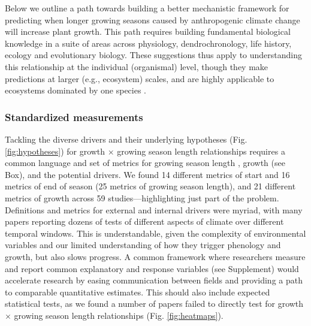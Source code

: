 \documentclass[11pt]{article}
\begin{document}

Below we outline a path towards building a better mechanistic framework for predicting when longer growing seasons caused by anthropogenic climate change will increase plant growth. This path requires building fundamental biological knowledge in a suite of areas across physiology, dendrochronology, life history, ecology and evolutionary biology. These suggestions thus apply to understanding this relationship at the individual (organismal) level, though they make predictions at larger (e.g., ecosystem) scales, and are highly applicable to ecosystems dominated by one species \citep[e.g.,][]{chen1999effects}. %

\subsubsection*{Standardized measurements} %

Tackling the diverse drivers and their underlying hypotheses (Fig. \ref{fig:hypotheses}) for growth $\times$ growing season length relationships requires a common language and set of metrics for growing season length \citep{korner2023four}, growth (see Box), and the potential drivers. We found 14 different metrics of start and 16 metrics of end of season (25 metrics of growing season length), and 21 different metrics of growth across 59 studies---highlighting just part of the problem. Definitions and metrics for external and internal drivers were myriad, with many papers reporting dozens of tests of different aspects of climate over different temporal windows. This is understandable, given the complexity of environmental variables and our limited understanding of how they trigger phenology and growth, but also slows progress. A common framework where researchers measure and report common explanatory and response variables (see Supplement) would accelerate research by easing communication between fields and providing a path to comparable quantitative estimates. This should also include expected statistical tests, as we found a number of papers failed to directly test for growth $\times$ growing season length relationships (Fig. \ref{fig:heatmaps}). %
\end{document}
